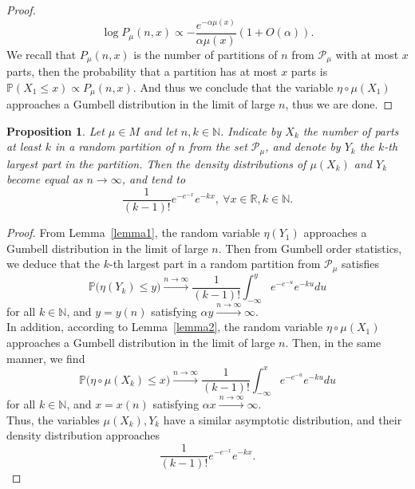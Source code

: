 \documentclass[pdflatex,sn-mathphys-num]{sn-jnl}%
\theoremstyle{thmstyleone}%
\newtheorem{proposition}[theorem]{Proposition}%
\theoremstyle{thmstyletwo}%
\theoremstyle{thmstylethree}%
\theoremstyle{thmstylethree}%
\theoremstyle{thmstylethree}%
\begin{document}
\begin{proof}
\begin{equation*}
    \log P_\mu(n,x)\propto -\frac{e^{-\alpha\mu(x)}}{\alpha\mu(x)}(1+O(\alpha)).
\end{equation*}
We recall that $P_\mu(n,x)$ is the number of partitions of $n$ from $\mathcal{P}_\mu$ with at most $x$ parts, then the probability that a partition has at most $x$ parts is $\mathbb{P}(X_1\le x)\propto P_\mu(n,x)$. And thus we conclude that the variable $\eta\circ\mu(X_1)$ approaches a Gumbell distribution in the limit of large $n$, thus we are done.
\end{proof}
\begin{proposition}\label{prop1}
    Let $\mu\in M$ and let $n,k\in\mathbb{N}$. Indicate by $X_k$ the number of parts at least $k$ in a random partition of $n$ from the set $\mathcal{P}_\mu$, and denote by $Y_k$ the $k$-th largest part in the partition. Then the density distributions of $\mu(X_k)$ and $Y_k$ become equal as $n\to\infty$, and tend to
    \begin{equation*}\label{prop1}
        \frac{1}{(k-1)!}e^{-e^{-x}}e^{-kx}, \ \forall x\in\mathbb{R}, k\in\mathbb{N}.
    \end{equation*}
\end{proposition}
\begin{proof}
    From Lemma~\ref{lemma1}, the random variable $\eta(Y_1)$ approaches a Gumbell distribution in the limit of large $n$. Then from Gumbell order statistics, we deduce that the $k$-th largest part in a random partition from $\mathcal{P}_\mu$ satisfies
\begin{equation}\label{eq5}
    \mathbb{P}\big(\eta(Y_k)\le y\big)\xrightarrow{n\to\infty}\frac{1}{(k-1)!}\int_{-\infty}^ye^{-e^{-u}}e^{-ku}du
\end{equation}
for all $k\in\mathbb{N}$, and $y=y(n)$ satisfying $\alpha y\xrightarrow{n\to\infty}\infty$. \\
In addition, according to Lemma~\ref{lemma2}, the random variable $\eta\circ\mu(X_1)$ approaches a Gumbell distribution in the limit of large $n$. Then, in the same manner, we find
\begin{equation}\label{eq6}
    \mathbb{P}\big(\eta\circ\mu(X_k)\le x\big)\xrightarrow{n\to\infty}\frac{1}{(k-1)!}\int_{-\infty}^xe^{-e^{-u}}e^{-ku}du
\end{equation}
for all $k\in\mathbb{N}$, and $x=x(n)$ satisfying $\alpha x\xrightarrow{n\to\infty}\infty$. \\
Thus, the variables $\mu(X_k), Y_k$ have a similar asymptotic distribution, and their density distribution approaches
\begin{equation*}
    \frac{1}{(k-1)!}e^{-e^{-x}}e^{-kx}.
\end{equation*}
\end{proof}
\end{document}
